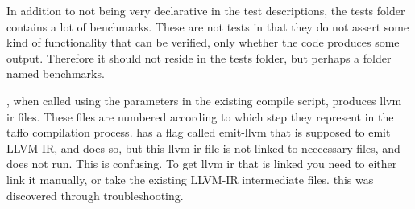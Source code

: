 In addition to not being very declarative in the test descriptions, the tests folder contains a lot of benchmarks. These are not tests in that they do not assert some kind of functionality that can be verified, only whether the code produces \*some\* output. Therefore it should not reside in the tests folder, but perhaps a folder named benchmarks.

\taffo{}, when called using the parameters in the existing compile script, produces llvm ir files. These files are numbered according to which step they represent in the taffo compilation process. \taffo{} has a flag called emit-llvm that is supposed to emit LLVM-IR, and does so, but this llvm-ir file is not linked to neccessary files, and does not run. This is confusing. 
To get llvm ir that is linked you need to either link it manually, or take the existing LLVM-IR intermediate files. this was discovered through troubleshooting. 
